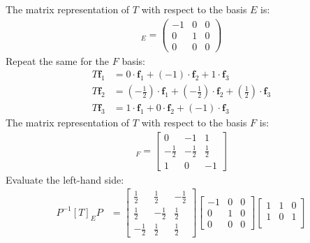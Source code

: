 \begin{enumerate}
\begin{enumerate}[label={(\alph*)}]
    The matrix representation of $T$ with respect to the basis $E$ is:
    \begin{align}
        [T]_E = \begin{pmatrix}
        -1 & 0 & 0 \\
        0 & 1 & 0 \\
        0 & 0 & 0
        \end{pmatrix}
    \end{align}
    Repeat the same for the $F$ basis:
    \begin{align*}
        T \mathbf{f}_1 &= 0 \cdot \mathbf{f}_1 + (-1) \cdot \mathbf{f}_2 + 1 \cdot \mathbf{f}_3\\
        T \mathbf{f}_2 &= \left(-\frac{1}{2}\right) \cdot \mathbf{f}_1 + \left(-\frac{1}{2}\right) \cdot \mathbf{f}_2 + \left(\frac{1}{2}\right) \cdot \mathbf{f}_3\\
        T \mathbf{f}_3 &= 1 \cdot \mathbf{f}_1 + 0 \cdot \mathbf{f}_2 + (-1) \cdot \mathbf{f}_3
    \end{align*}
    The matrix representation of $T$ with respect to the basis $F$ is:
    \begin{align}
        [T]_F = \begin{bmatrix}
        0 & -1 & 1 \\[10pt]
        \displaystyle -\frac{1}{2} & \displaystyle-\frac{1}{2} & \displaystyle\frac{1}{2} \\[10pt]
        1 & 0 & -1
        \end{bmatrix}
    \end{align}
    Evaluate the left-hand side:
    \begin{align*}
        P^{-1}[T]_EP&=\begin{bmatrix}
        \displaystyle\frac{1}{2}&\displaystyle\frac{1}{2}&\displaystyle-\frac{1}{2} \\[10pt]
         \displaystyle\frac{1}{2}&\displaystyle-\frac{1}{2}&\displaystyle\frac{1}{2} \\[10pt]
         \displaystyle-\frac{1}{2}&\displaystyle\frac{1}{2}&\displaystyle\frac{1}{2}
                \end{bmatrix}\begin{bmatrix}
            -1 & 0 & 0 \\
            0 & 1 & 0 \\
            0 & 0 & 0
            \end{bmatrix}\begin{bmatrix}
           1&1&0\\
           1&0&1\\

\end{bmatrix}
\end{align*}
\end{enumerate}
\end{enumerate}
